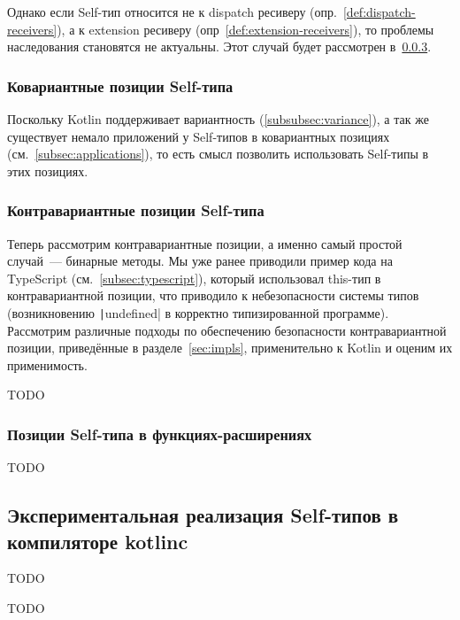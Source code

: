 Однако если Self-тип относится не к dispatch ресиверу (опр.~\ref{def:dispatch-receivers}), а к extension ресиверу (опр~\ref{def:extension-receivers}), то проблемы наследования становятся не актуальны.
Этот случай будет рассмотрен в~\ref{subsubsec:extension-position}.

\subsubsection{Ковариантные позиции Self-типа}

Поскольку Kotlin поддерживает вариантность (\ref{subsubsec:variance}), а так же существует немало приложений у Self-типов в ковариантных позициях (см.~\ref{subsec:applications}), то есть смысл позволить использовать Self-типы в этих позициях.

\subsubsection{Контравариантные позиции Self-типа}

Теперь рассмотрим контравариантные позиции, а именно самый простой случай~--- бинарные методы.
Мы уже ранее приводили пример кода на TypeScript (см.~\ref{subsec:typescript}), который использовал this-тип в контравариантной позиции, что приводило к небезопасности системы типов (возникновению \texttt|undefined| в корректно типизированной программе).
Рассмотрим различные подходы по обеспечению безопасности контравариантной позиции, приведённые в разделе~\ref{sec:impls}, применительно к Kotlin и оценим их применимость.

TODO %

\subsubsection{Позиции Self-типа в функциях-расширениях} \label{subsubsec:extension-position}

TODO %


\subsection{Экспериментальная реализация Self-типов в компиляторе kotlinc}

TODO %

TODO %

